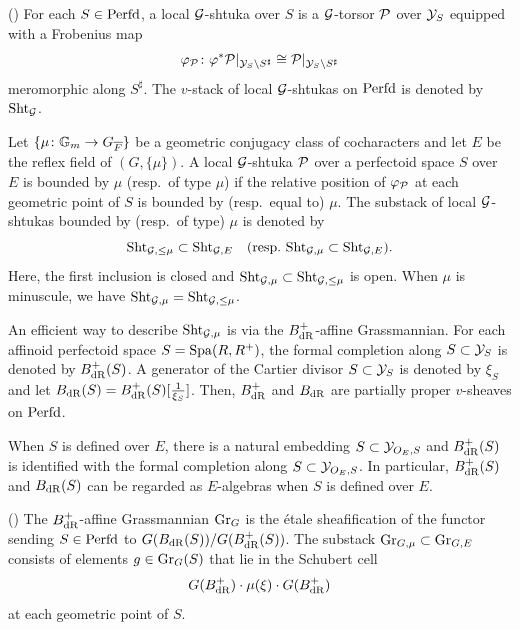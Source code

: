 \documentclass[12pt,reqno]{amsart}
\begin{document}
\begin{defi}(\cite[Section 23.1]{SW20})
    For each $S \in {\operatorname{Perfd}}$, a local ${\mathcal{G}}$-shtuka over $S$ is a ${\mathcal{G}}$-torsor ${\mathcal{P}}$ over ${\mathcal{Y}}_S$ equipped with a Frobenius map
    \[
        \varphi_{{\mathcal{P}}}\colon \varphi^*{\mathcal{P}}\vert_{{\mathcal{Y}}_S\backslash S^\sharp} \cong {\mathcal{P}}\vert_{{\mathcal{Y}}_S\backslash S^\sharp}
    \]
    meromorphic along $S^\sharp$. The $v$-stack of local ${\mathcal{G}}$-shtukas on ${\operatorname{Perfd}}$ is denoted by ${\operatorname{Sht}}_{{\mathcal{G}}}$. 
\end{defi}

Let $\{\mu \colon \mathbb{G}_m \to G_{{\overline{F}}}\}$ be a geometric conjugacy class of cocharacters and let $E$ be the reflex field of $(G, \{ \mu \})$. %
A local ${\mathcal{G}}$-shtuka ${\mathcal{P}}$ over a perfectoid space $S$ over $E$ is bounded by $\mu$ (resp.\ of type $\mu$) if the relative position of $\varphi_{{\mathcal{P}}}$ at each geometric point of $S$ is bounded by (resp.\ equal to) $\mu$. The substack of local ${\mathcal{G}}$-shtukas bounded by (resp.\ of type) $\mu$ is denoted by
\[
    {\operatorname{Sht}}_{{\mathcal{G}}, \leq \mu} \subset {\operatorname{Sht}}_{{\mathcal{G}}, E} \quad (\textup{resp.}\ {\operatorname{Sht}}_{{\mathcal{G}}, \mu} \subset {\operatorname{Sht}}_{{\mathcal{G}}, E}). 
\]
Here, the first inclusion is closed and ${\operatorname{Sht}}_{{\mathcal{G}}, \mu} \subset {\operatorname{Sht}}_{{\mathcal{G}}, \leq \mu}$ is open. When $\mu$ is minuscule, we have ${\operatorname{Sht}}_{{\mathcal{G}}, \mu} = {\operatorname{Sht}}_{{\mathcal{G}}, \leq \mu}$. 

An efficient way to describe ${\operatorname{Sht}}_{{\mathcal{G}}, \mu}$ is via the $B^+_{\operatorname{dR}}$-affine Grassmannian. For each affinoid perfectoid space $S = {\operatorname{Spa}}(R,R^+)$, the formal completion along $S \subset {\mathcal{Y}}_S$ is denoted by $B^+_{\operatorname{dR}}(S)$. A generator of the Cartier divisor $S \subset {\mathcal{Y}}_S$ is denoted by $\xi_S$ and let $B_{\operatorname{dR}}(S) = B^+_{\operatorname{dR}}(S)[\tfrac{1}{\xi_S}]$. Then, $B^+_{\operatorname{dR}}$ and $B_{\operatorname{dR}}$ are partially proper $v$-sheaves on ${\operatorname{Perfd}}$. 

When $S$ is defined over $E$, there is a natural embedding $S \subset {\mathcal{Y}}_{O_E, S}$ and $B^+_{\operatorname{dR}}(S)$ is identified with the formal completion along $S \subset {\mathcal{Y}}_{O_E, S}$. In particular, $B^+_{\operatorname{dR}}(S)$ and $B_{\operatorname{dR}}(S)$ can be regarded as $E$-algebras when $S$ is defined over $E$. 

\begin{defi}\textup{(\cite[Definition 19.1.1]{SW20})}
   The $B^+_{\operatorname{dR}}$-affine Grassmannian ${\operatorname{Gr}}_G$ is the \'{e}tale sheafification of the functor sending $S \in {\operatorname{Perfd}}$ to $G(B_{\operatorname{dR}}(S)) / G(B^+_{\operatorname{dR}}(S))$. The substack ${\operatorname{Gr}}_{G, \mu} \subset {\operatorname{Gr}}_{G, E}$ consists of elements $g \in {\operatorname{Gr}}_G(S)$ that lie in the Schubert cell
   \[
        G(B^+_{\operatorname{dR}}) \cdot \mu(\xi) \cdot G(B^+_{\operatorname{dR}})
   \]
   at each geometric point of $S$. 
\end{defi}
\end{document}
